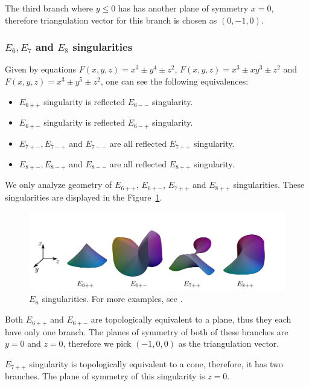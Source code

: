 The third branch where $y\leq0$ has has another plane of symmetry $x=0$,
therefore triangulation vector for this branch is chosen as $(0, -1, 0)$.

\subsubsection*{$E_6, E_7$ and $E_8$ singularities}

Given by equations $F(x,y,z)=x^3\pm y^4\pm z^2$, $F(x,y,z)=x^3\pm xy^3\pm z^2$
and $F(x,y,z)=x^3\pm y^5\pm z^2$, one can see the following equivalences:
\begin{itemize}
\item $E_{6++}$ singularity is reflected $E_{6--}$ singularity.
\item $E_{6+-}$ singularity is reflected $E_{6-+}$ singularity.
\item $E_{7+-}, E_{7-+}$ and $E_{7--}$ are all reflected $E_{7++}$ singularity.
\item $E_{8+-}, E_{8-+}$ and $E_{8--}$ are all reflected $E_{8++}$ singularity.
\end{itemize} 

We only analyze geometry of $E_{6++}$, $E_{6+-}$, $E_{7++}$ and $E_{8++}$
singularities. These singularities are displayed in the Figure~\ref{img:12}.


\begin{figure}
    \centerline{\includegraphics[scale=0.5]{images/img12}}
    \caption[$E_n$ singularities]
    {$E_n$ singularities. For more examples, see \cite{morris2003client}.}
    \label{img:12}
\end{figure}
Both $E_{6++}$ and $E_{6+-}$ are topologically equivalent to a plane, thus
they each have only one branch. The planes of symmetry of both of these 
branches are $y=0$ and $z=0$, therefore we pick $(-1, 0, 0)$ as the
triangulation vector.

$E_{7++}$ singularity is topologically equivalent to a cone, therefore, it has
two branches. The plane of symmetry of this singularity is $z=0$.

